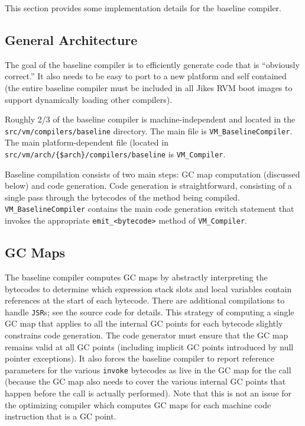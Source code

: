 This section provides some implementation details for the baseline
compiler. 

\subsection{General Architecture}
The goal of the baseline compiler is to efficiently generate code that
is ``obviously correct.'' It also needs to be easy to port to a new
platform and self contained (the entire baseline compiler must be
included in all Jikes RVM boot images to support dynamically loading
other compilers). 

Roughly 2/3 of the baseline compiler is machine-independent and
located in the {\tt src/vm/compilers/baseline} directory. The main file is
{\tt VM\_BaselineCompiler}. The main platform-dependent file (located
in {\tt src/\-vm/\-arch/\-\{\$arch\}/\-com\-pi\-lers/\-base\-line} is {\tt VM\_\-Com\-pi\-ler}. 

Baseline compilation consists of two main steps: GC map computation
(discussed below) and code generation.  Code generation is
straightforward, consisting of a single pass through the
bytecodes of the method being compiled. {\tt VM\_BaselineCompiler}
contains the main code generation switch statement that invokes the
appropriate {\tt emit\_<bytecode>} method of {\tt VM\_Compiler}. 

\subsection{GC Maps}
The baseline compiler computes GC maps by abstractly interpreting the
bytecodes to determine which expression stack slots and local
variables contain references at the start of each bytecode. There are
additional compilations to handle {\tt JSR}s; see the source code for
details. This strategy of computing a single GC map that applies to
all the internal GC points for each bytecode slightly constrains code
generation. The code generator must ensure that the GC map remains
valid at all GC points (including implicit GC points introduced by
null pointer exceptions). It also forces the baseline compiler to
report reference parameters for the various {\tt invoke} bytecodes as
live in the GC map for the call (because the GC map also needs to
cover the various internal GC points that happen before the call is
actually performed). Note that this is not an issue for the optimizing
compiler which computes GC maps for each machine code instruction that
is a GC point. 


